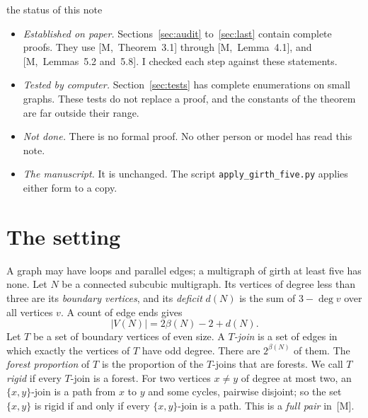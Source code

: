 \documentclass[11pt]{article}
\newcommand{\M}[1]{[M,~#1]}
\begin{document}
\begin{notation}{the status of this note}
\begin{itemize}[leftmargin=1.2em]
\item \emph{Established on paper.} Sections~\ref{sec:audit} to~\ref{sec:last} contain complete
proofs. They use \M{Theorem~3.1} through \M{Lemma~4.1}, and \M{Lemmas~5.2 and~5.8}. I checked
each step against these statements.
\item \emph{Tested by computer.} Section~\ref{sec:tests} has complete enumerations on small
graphs. These tests do not replace a proof, and the constants of the theorem are far outside
their range.
\item \emph{Not done.} There is no formal proof. No other person or model has read this note.
\item \emph{The manuscript.} It is unchanged. The script \texttt{apply\_girth\_five.py} applies
either form to a copy.
\end{itemize}
\end{notation}

\contentsblock

\section{The setting}\label{sec:setting}

A graph may have loops and parallel edges; a multigraph of girth at least five has none. Let $N$
be a connected subcubic multigraph. Its vertices of degree less than three are its
\emph{boundary vertices}, and its \emph{deficit} $d(N)$ is the sum of $3-\deg v$ over all
vertices $v$. A count of edge ends gives
\begin{equation}\label{eq:deficit}
  |V(N)|=2\beta(N)-2+d(N).
\end{equation}
Let $T$ be a set of boundary vertices of even size. A \emph{$T$-join} is a set of edges in which
exactly the vertices of $T$ have odd degree. There are $2^{\beta(N)}$ of them. The \emph{forest
proportion} of $T$ is the proportion of the $T$-joins that are forests. We call $T$ \emph{rigid}
if every $T$-join is a forest. For two vertices $x\ne y$ of degree at most two, an
$\{x,y\}$-join is a path from $x$ to $y$ and some cycles, pairwise disjoint; so the set
$\{x,y\}$ is rigid if and only if every $\{x,y\}$-join is a path. This is a \emph{full pair}
in~[M].
\end{document}
